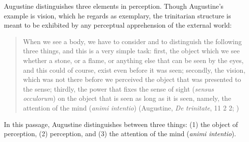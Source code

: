 \documentclass[12pt]{article}
\begin{document}
Augustine distinguishes three elements in perception. Though Augustine's example is vision, which he regards as exemplary, the trinitarian structure is meant to be exhibited by any perceptual apprehension of the external world:
\begin{quote}
	When we see a body, we have to consider and to distinguish the following three things, and this is a very simple task: first, the object which we see whether a stone, or a flame, or anything else that can be seen by the eyes, and this could of course, exist even before it was seen; secondly, the vision, which was not there before we perceived the object that was presented to the sense; thirdly, the power that fixes the sense of sight (\emph{sensus occulorum}) on the object that is seen as long as it is seen, namely, the attention of the mind (\emph{animi intentio}) (Augustine, \emph{De trinitate}, 11 2 2; \citealt[61--62]{Matthews:2002ly})
\end{quote}
In this passage, Augustine distinguishes between three things: (1) the object of perception, (2) perception, and (3) the attention of the mind (\emph{animi intentio}).
\end{document}
